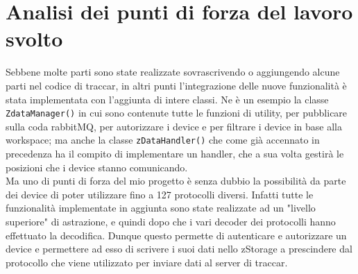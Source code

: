 \documentclass[a4paper,titlepage,12pt]{book}
\begin{document}
\section{\sffamily
Analisi dei punti di forza del lavoro svolto}
Sebbene molte parti sono state realizzate sovrascrivendo o aggiungendo alcune parti nel codice di traccar, in altri punti  l'integrazione delle nuove funzionalità è stata implementata con l'aggiunta di intere classi. Ne è un esempio la classe \texttt{ZdataManager()} in cui sono contenute tutte le funzioni di utility, per pubblicare sulla coda rabbitMQ, per autorizzare i device e per filtrare i device in base alla workspace; ma anche la classe \texttt{zDataHandler()}  che come già accennato in precedenza ha il compito di implementare un handler, che a sua volta gestirà le posizioni che i device stanno comunicando.\\
Ma uno di punti di forza del mio progetto è senza dubbio la possibilità da parte dei device di poter utilizzare fino a 127 protocolli diversi. Infatti tutte le funzionalità implementate in aggiunta sono state realizzate ad un "livello superiore" di astrazione, e quindi dopo che i vari decoder dei protocolli hanno effettuato la decodifica. Dunque questo permette di autenticare e autorizzare un device e permettere ad esso di scrivere i suoi dati nello zStorage a prescindere dal protocollo che viene utilizzato per inviare dati al server di traccar.
\end{document}
